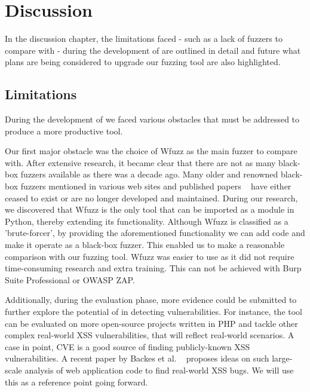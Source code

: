 \chapter{Discussion}
\label{sec:discussion}
\minitoc
\vspace*{1cm}

In the discussion chapter, the limitations faced - such as a lack of fuzzers to compare with - during the development of \pname{} are outlined in detail and future what plans are being considered to upgrade our fuzzing tool are also highlighted.

\section{Limitations}
During the development of \pname{} we faced various obstacles that must be addressed to produce a more productive tool.

Our first major obstacle was the choice of Wfuzz as the main fuzzer to compare \pname{} with. After extensive research, it became clear that there are not as many black-box fuzzers available as there was a decade ago. Many older and renowned black-box fuzzers mentioned in various web sites and published papers ~\cite{doupe2010johnny, bau2010state, duchene2014kameleonfuzz} have either ceased to exist or are no longer developed and maintained. During our research, we discovered that Wfuzz is the only tool that can be imported as a module in Python, thereby extending its functionality. Although Wfuzz is classified as a 'brute-forcer', by providing the aforementioned functionality we can add code and make it operate as a black-box fuzzer. This enabled us to make a reasonable comparison with our fuzzing tool. Wfuzz was easier to use as it did not require time-consuming research and extra training. This can not be achieved with Burp Suite Professional or OWASP ZAP.

Additionally, during the evaluation phase, more evidence could be submitted to further explore the potential of \pname{} in detecting vulnerabilities. For instance, the tool can be evaluated on more open-source projects written in PHP and tackle other complex real-world XSS vulnerabilities, that will reflect real-world scenarios. A case in point, CVE is a good source of finding publicly-known XSS vulnerabilities. A recent paper by Backes et al. ~\cite{efficient2017} proposes ideas on such large-scale analysis of web application code to find real-world XSS bugs. We will use this as a reference point going forward. 

